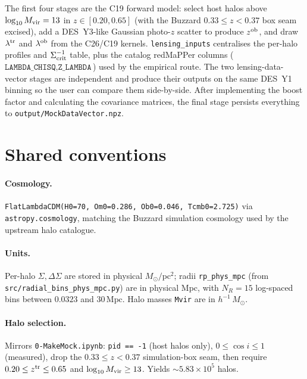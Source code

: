 \documentclass[a4paper, 11pt]{article}
\newcommand{\lob}{\lambda^{\rm ob}}
\newcommand{\ltr}{\lambda^{\rm tr}}
\newcommand{\zob}{z^{\rm ob}}
\newcommand{\ztr}{z^{\rm tr}}
\newcommand{\hMsun}{h^{-1}\,M_{\odot}}
\newcommand{\modname}[1]{\textcolor{kwcol}{\texttt{#1}}}
\newcommand{\blk}[1]{\textcolor{datablockcol}{\texttt{#1}}}
\newcommand{\pyfile}[1]{{\small\texttt{#1}}}
\begin{document}
The first four stages are the C19 forward model: select host halos above
$\log_{10} M_{\rm vir} = 13$ in $z \in [0.20, 0.65]$ (with the Buzzard
$0.33 \le z < 0.37$ box seam excised), add a DES~Y3-like Gaussian photo-$z$
scatter to produce $\zob$, and draw $\ltr$ and $\lob$ from the C26/C19
kernels. \modname{lensing\_inputs} centralises the per-halo profiles and
$\Sigma_{\rm crit}^{-1}$ table, plus the catalog redMaPPer columns
($\texttt{LAMBDA\_CHISQ}, \texttt{Z\_LAMBDA}$) used by the empirical route.
The two lensing-data-vector stages are independent and produce their
outputs on the same DES~Y1 binning so the user can compare them
side-by-side. After implementing the boost factor and calculating the covariance matrices, the final stage persists everything to
\pyfile{output/MockDataVector.npz}.

\section{Shared conventions}
\label{sec:conventions}

\paragraph{Cosmology.} \texttt{FlatLambdaCDM(H0=70, Om0=0.286, Ob0=0.046,
Tcmb0=2.725)} via \texttt{astropy.cosmology}, matching the Buzzard
simulation cosmology used by the upstream halo catalogue.

\paragraph{Units.} Per-halo $\Sigma, \Delta\Sigma$ are stored in physical
$M_\odot/\mathrm{pc}^2$; radii \blk{rp\_phys\_mpc} (from
\pyfile{src/radial\_bins\_phys\_mpc.py}) are in physical Mpc, with $N_R = 15$
log-spaced bins between $0.0323$ and $30\,\mathrm{Mpc}$. Halo masses
\blk{Mvir} are in $\hMsun$.

\paragraph{Halo selection.} Mirrors \pyfile{0-MakeMock.ipynb}:
\texttt{pid == -1} (host halos only), $0 \le \cos i \le 1$ (measured), drop
the $0.33 \le z < 0.37$ simulation-box seam, then require $0.20 \le \ztr
\le 0.65$ and $\log_{10} M_{\rm vir} \ge 13$. Yields $\sim 5.83 \times
10^5$ halos.
\end{document}
